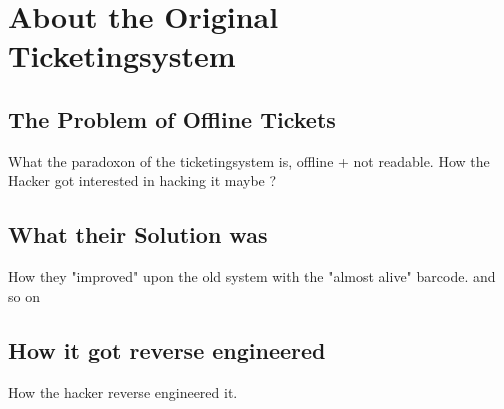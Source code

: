 \section{About the Original Ticketingsystem}

\subsection{The Problem of Offline Tickets}

What the paradoxon of the ticketingsystem is, offline + not readable.
How the Hacker got interested in hacking it maybe ?

\subsection{What their Solution was}
How they "improved" upon the old system with the "almost alive" barcode.
and so on
\subsection{How it got reverse engineered}

How the hacker reverse engineered it.
